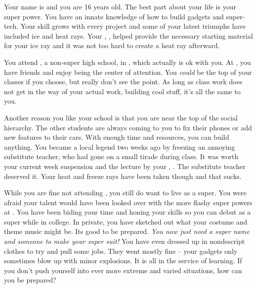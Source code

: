 \documentclass[char]{LRSguildcamp1}
\begin{document}
\name{\cTeen{}}



Your name is \cTeen{\intro} and you are 16 years old. The best part about your life is your super power. You have an innate knowledge of how to build gadgets and super-tech. Your skill grows with every project and some of your latest triumphs have included ice and heat rays. Your \cOldest{\uncle}, \cOldest{}, helped provide the necessary starting material for your ice ray and it was not too hard to create a heat ray afterward. 

You attend \pNormalSchool{}, a non-super high school, in \pCityArchitect{}, which actually is ok with you. At \pNormalSchool{}, you have friends and enjoy being the center of attention. You \textsl{could} be the top of your classes if you choose, but really don't see the point. As long as class work does not get in the way of your actual work, building cool stuff, it's all the same to you. 

Another reason you like your school is that you are near the top of the social hierarchy. The other students are always coming to you to fix their phones or add new features to their cars. With enough time and resources, you can build anything. You became a local legend two weeks ago by freezing an annoying substitute teacher, who had gone on a small tirade during class. It was worth your current week suspension and the lecture by your \cArchitect{\parent}, \cArchitect{}. The substitute teacher deserved it. Your heat and freeze rays have been taken though and that sucks. 

While you are fine not attending \pSuperSchool{}, you still do want to live as a super. You were afraid your talent would have been looked over with the more flashy super powers at \pSuperSchool{}. You have been biding your time and honing your skills so you can debut as a super while in college. In private, you have sketched out what your costume and theme music might be. Its good to be prepared. \textit{You now just need a super name and someone to make your super suit!} You have even dressed up in nondescript clothes to try and pull some jobs. They went mostly fine -- your gadgets only sometimes blow up with minor explosions. It is all in the service of learning. If you don't push yourself into ever more extreme and varied situations, how can you be prepared? 
\end{document}
